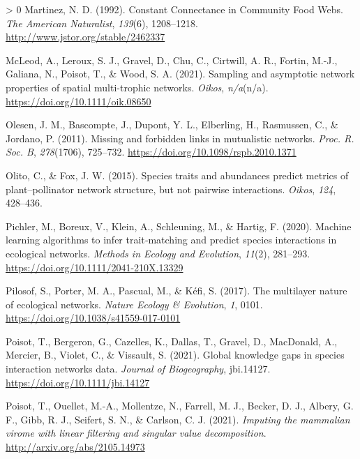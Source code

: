 \documentclass[11pt]{article}
\newlength{\cslhangindent}
\newenvironment{CSLReferences}[3] %
 {%
  \setlength{\parindent}{0pt}
  \ifodd #1 \everypar{\setlength{\hangindent}{\cslhangindent}}\ignorespaces\fi
  \ifnum #2 > 0
  \setlength{\parskip}{#2\baselineskip}
  \fi
 }%
 {}
\begin{document}
\begin{CSLReferences}{1}{0}
\leavevmode\hypertarget{ref-Martinez1992ConCon}{}%
Martinez, N. D. (1992). Constant Connectance in Community Food Webs.
\emph{The American Naturalist}, \emph{139}(6), 1208--1218.
\url{http://www.jstor.org/stable/2462337}

\leavevmode\hypertarget{ref-McLeod2021SamAsy}{}%
McLeod, A., Leroux, S. J., Gravel, D., Chu, C., Cirtwill, A. R., Fortin,
M.-J., Galiana, N., Poisot, T., \& Wood, S. A. (2021). Sampling and
asymptotic network properties of spatial multi-trophic networks.
\emph{Oikos}, \emph{n/a}(n/a). \url{https://doi.org/10.1111/oik.08650}

\leavevmode\hypertarget{ref-Olesen2011MisFor}{}%
Olesen, J. M., Bascompte, J., Dupont, Y. L., Elberling, H., Rasmussen,
C., \& Jordano, P. (2011). Missing and forbidden links in mutualistic
networks. \emph{Proc. R. Soc. B}, \emph{278}(1706), 725--732.
\url{https://doi.org/10.1098/rspb.2010.1371}

\leavevmode\hypertarget{ref-Olito2015SpeTra}{}%
Olito, C., \& Fox, J. W. (2015). Species traits and abundances predict
metrics of plant--pollinator network structure, but not pairwise
interactions. \emph{Oikos}, \emph{124}, 428--436.

\leavevmode\hypertarget{ref-Pichler2020MacLea}{}%
Pichler, M., Boreux, V., Klein, A., Schleuning, M., \& Hartig, F.
(2020). Machine learning algorithms to infer trait‐matching and predict
species interactions in ecological networks. \emph{Methods in Ecology
and Evolution}, \emph{11}(2), 281--293.
\url{https://doi.org/10.1111/2041-210X.13329}

\leavevmode\hypertarget{ref-Pilosof2017MulNat}{}%
Pilosof, S., Porter, M. A., Pascual, M., \& Kéfi, S. (2017). The
multilayer nature of ecological networks. \emph{Nature Ecology \&
Evolution}, \emph{1}, 0101.
\url{https://doi.org/10.1038/s41559-017-0101}

\leavevmode\hypertarget{ref-Poisot2021GloKno}{}%
Poisot, T., Bergeron, G., Cazelles, K., Dallas, T., Gravel, D.,
MacDonald, A., Mercier, B., Violet, C., \& Vissault, S. (2021). Global
knowledge gaps in species interaction networks data. \emph{Journal of
Biogeography}, jbi.14127. \url{https://doi.org/10.1111/jbi.14127}

\leavevmode\hypertarget{ref-Poisot2021ImpMam}{}%
Poisot, T., Ouellet, M.-A., Mollentze, N., Farrell, M. J., Becker, D.
J., Albery, G. F., Gibb, R. J., Seifert, S. N., \& Carlson, C. J.
(2021). \emph{Imputing the mammalian virome with linear filtering and
singular value decomposition}. \url{http://arxiv.org/abs/2105.14973}


\end{CSLReferences}
\end{document}
